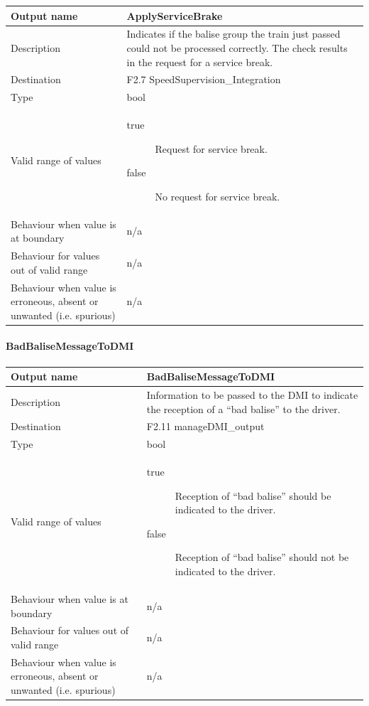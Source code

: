 \begin{longtable}{p{}p{}}
\toprule
Output name				& ApplyServiceBrake \\
\midrule
Description				&  Indicates if the balise group the train just passed could not be processed correctly. The check results in the request for a service break. \\
\midrule
Destination				& F2.7 SpeedSupervision\_Integration\\ 
\midrule
Type					& bool \\
\midrule
Valid range of values	& 
\begin{description}
\item[true] Request for service break.
\item[false] No request for service break.
\end{description}\\
\midrule
Behaviour when value is at boundary	& n/a\\
\midrule
Behaviour for values out of valid range	& n/a\\
\midrule
Behaviour when value is erroneous, absent or unwanted (i.e. spurious) & n/a\\
\bottomrule
\end{longtable}


\paragraph{BadBaliseMessageToDMI}

\begin{longtable}{p{}p{}}
\toprule
Output name				& BadBaliseMessageToDMI \\
\midrule
Description				& Information to be passed to the DMI to indicate the reception of a ``bad balise'' to the driver. \\
\midrule
Destination				& F2.11 manageDMI\_output
\\
\midrule
Type					& bool \\
\midrule
Valid range of values	& 
\begin{description}
\item[true] Reception of ``bad balise'' should be indicated to the driver.
\item[false] Reception of ``bad balise'' should not be indicated to the driver.
\end{description}\\
\midrule
Behaviour when value is at boundary	& n/a\\
\midrule
Behaviour for values out of valid range	&  n/a\\
\midrule
Behaviour when value is erroneous, absent or unwanted (i.e. spurious) &  n/a\\
\bottomrule
\end{longtable}


